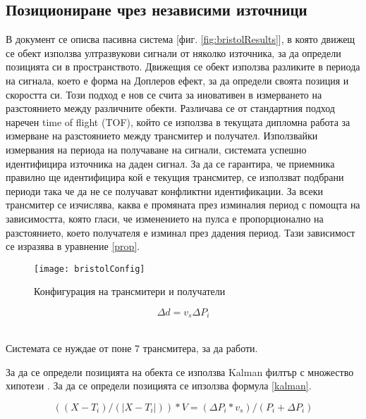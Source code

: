 \subsection{Позициониране чрез независими източници}

В документ \cite{bristolBeacons} се описва пасивна система [фиг. \ref{fig:bristolResults}], в която движещ се обект използва ултразвукови сигнали от няколко източника, за да определи позицията си в пространството. Движещия се обект използва разликите в периода на сигнала, което е форма на Доплеров ефект, за да определи своята позиция и скоростта си. Този подход е нов се счита за иновативен в измерването на разстоянието между различните обекти. Различава се от стандартния подход наречен time of flight (TOF), който се използва в текущата дипломна работа за измерване на разстоянието между трансмитер и получател. Използвайки измервания на периода на получаване на сигнали, системата успешно идентифицира източника на даден сигнал. За да се гарантира, че приемника правилно ще идентифицира кой е текущия трансмитер, се използват подбрани периоди така че да не се получават конфликтни идентификации. За всеки трансмитер се изчислява, каква е промяната през изминалия период с помощта на зависимостта, която гласи, че изменението на пулса е пропорционално на разстоянието, което получателя е изминал през дадения период. Тази зависимост се изразява в уравнение \ref{prop}.

\begin{figure}
    \centering
    \centerline{\texttt{[image: bristolConfig]}}
    \caption{Конфигурация на трансмитери и получатели}
    \label{bristolVis}
\end{figure}


\centerline{\begin{equation} \label{prop}
    \Delta d = v_s \Delta P_i
\end{equation}} \\

Системата се нуждае от поне 7 трансмитера, за да работи. 

За да се определи позицията на обекта се използва Kalman филтър с множество хипотези \cite{kalmanFilter}. За да се определи позицията се ипзолзва формула \ref{kalman}.

\centerline{\begin{equation} \label{kalman}
    ((X-T_i)/ (|X-T_i|)) * V = (\Delta P_i * v_s) / (P_i + \Delta P_i)
\end{equation}}\\

